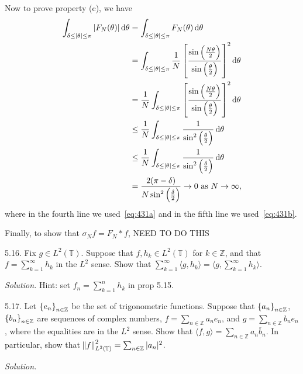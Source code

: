 \documentclass{article}
\newcommand{\T}{\mathbb{T}}
\newcommand{\Z}{\mathbb{Z}}
\begin{document}
Now to prove property (c), we have
%
\begin{align*}
    \int_{\delta \leq |\theta| \leq \pi} |F_N(\theta)| \dif \theta
        &= \int_{\delta \leq |\theta| \leq \pi} F_N(\theta) \dif \theta \\
        &= \int_{\delta \leq |\theta| \leq \pi}
            \frac{1}{N} \sbr{\frac{\sin \del{\frac{N \theta}{2}}}{\sin \del{\frac{\theta}{2}}}}^2
            \dif \theta \\
        &= \frac{1}{N} \int_{\delta \leq |\theta| \leq \pi}
            \sbr{\frac{\sin \del{\frac{N \theta}{2}}}{\sin \del{\frac{\theta}{2}}}}^2
            \dif \theta \\
        &\leq \frac{1}{N} \int_{\delta \leq |\theta| \leq \pi}
            \frac{1}{\sin^2 \del{\frac{\theta}{2}}}
            \dif \theta \\
        &\leq \frac{1}{N} \int_{\delta \leq |\theta| \leq \pi}
            \frac{1}{\sin^2 \del{\frac{\delta}{2}}}
            \dif \theta \\
        &= \frac{2 (\pi - \delta)}{N \sin^2 \del{\frac{\delta}{2}}}
        \to 0 \text{ as } N \to \infty
    ,
\end{align*}
%
where in the fourth line we used~\eqref{eq:431a} and in the fifth line
we used~\eqref{eq:431b}.

Finally, to show that $\sigma_N f = F_N * f$, 
NEED TO DO THIS

\newpage

5.16. Fix $g \in L^2(\T)$. Suppose that $f, h_k \in L^2(\T)$ for $k \in \Z$,
and that $f = \sum_{k = 1}^\infty h_k$ in the $L^2$ sense. Show that
$\sum_{k = 1}^\infty \langle g, h_k \rangle = \langle g, \sum_{k = 1}^\infty h_k \rangle$.

\textit{Solution.}
Hint: set $f_n = \sum_{k = 1}^n h_k$ in prop 5.15.

\newpage

5.17. Let $\cbr{e_n}_{n \in \Z}$ be the set of trigonometric functions.
Suppose that $\cbr{a_n}_{n \in \Z}$, $\cbr{b_n}_{n \in \Z}$ are sequences
of complex numbers, $f = \sum_{n \in \Z} a_n e_n$, and
$g = \sum_{n \in \Z} b_n e_n$, where the equalities are in the $L^2$ sense.
Show that $\langle f, g \rangle = \sum_{n \in \Z} a_n \overline{b}_n$.
In particular, show that $\norm{f}^2_{L^2(\T)} = \sum_{n \in \Z} |a_n|^2$.

\textit{Solution.}
\end{document}
